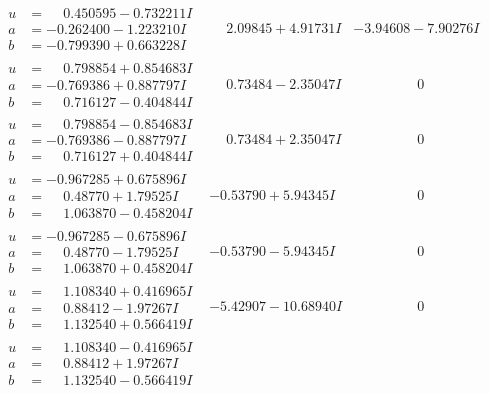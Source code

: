 \documentclass[1p]{elsarticle_modified}
\theoremstyle{definition}
\begin{document}
$$\begin{array}{c|c|c}
\begin{aligned}
u &= \phantom{-}0.450595 - 0.732211 I \\
a &= -0.262400 - 1.223210 I \\
b &= -0.799390 + 0.663228 I\end{aligned}
 & \phantom{-}2.09845 + 4.91731 I & -3.94608 - 7.90276 I \\ \hline\begin{aligned}
u &= \phantom{-}0.798854 + 0.854683 I \\
a &= -0.769386 + 0.887797 I \\
b &= \phantom{-}0.716127 - 0.404844 I\end{aligned}
 & \phantom{-}0.73484 - 2.35047 I & \phantom{-0.000000 } 0 \\ \hline\begin{aligned}
u &= \phantom{-}0.798854 - 0.854683 I \\
a &= -0.769386 - 0.887797 I \\
b &= \phantom{-}0.716127 + 0.404844 I\end{aligned}
 & \phantom{-}0.73484 + 2.35047 I & \phantom{-0.000000 } 0 \\ \hline\begin{aligned}
u &= -0.967285 + 0.675896 I \\
a &= \phantom{-}0.48770 + 1.79525 I \\
b &= \phantom{-}1.063870 - 0.458204 I\end{aligned}
 & -0.53790 + 5.94345 I & \phantom{-0.000000 } 0 \\ \hline\begin{aligned}
u &= -0.967285 - 0.675896 I \\
a &= \phantom{-}0.48770 - 1.79525 I \\
b &= \phantom{-}1.063870 + 0.458204 I\end{aligned}
 & -0.53790 - 5.94345 I & \phantom{-0.000000 } 0 \\ \hline\begin{aligned}
u &= \phantom{-}1.108340 + 0.416965 I \\
a &= \phantom{-}0.88412 - 1.97267 I \\
b &= \phantom{-}1.132540 + 0.566419 I\end{aligned}
 & -5.42907 - 10.68940 I & \phantom{-0.000000 } 0 \\ \hline\begin{aligned}
u &= \phantom{-}1.108340 - 0.416965 I \\
a &= \phantom{-}0.88412 + 1.97267 I \\
b &= \phantom{-}1.132540 - 0.566419 I\end{aligned}

\end{array}$$
\end{document}
